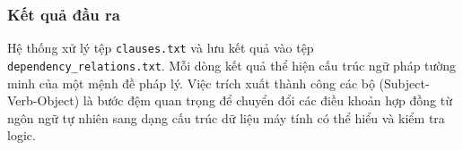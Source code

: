 \subsubsection{Kết quả đầu ra}
Hệ thống xử lý tệp \texttt{clauses.txt} và lưu kết quả vào tệp \texttt{dependency\_relations.txt}. Mỗi dòng kết quả thể hiện cấu trúc ngữ pháp tường minh của một mệnh đề pháp lý. Việc trích xuất thành công các bộ (Subject-Verb-Object) là bước đệm quan trọng để chuyển đổi các điều khoản hợp đồng từ ngôn ngữ tự nhiên sang dạng cấu trúc dữ liệu máy tính có thể hiểu và kiểm tra logic.